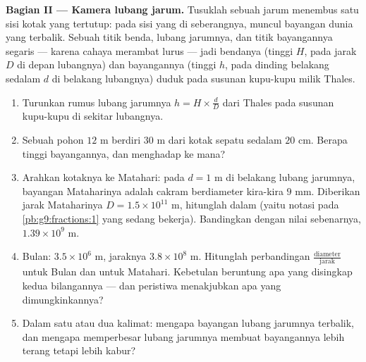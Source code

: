 \begin{problem}
\medskip
\noindent\textbf{Bagian II --- Kamera lubang jarum.}
Tusuklah sebuah jarum menembus satu sisi kotak yang tertutup: pada
sisi yang di seberangnya, muncul bayangan dunia yang terbalik. Sebuah
titik benda, lubang jarumnya, dan titik bayangannya segaris --- karena
cahaya merambat lurus --- jadi bendanya (tinggi $H$, pada jarak $D$
di depan lubangnya) dan bayangannya (tinggi $h$, pada dinding
belakang sedalam $d$ di belakang lubangnya) duduk pada susunan
kupu-kupu milik Thales.
\begin{enumerate}[resume]
  \item Turunkan rumus lubang jarumnya
        $h = H \times \frac dD$ dari Thales pada susunan kupu-kupu
        di sekitar lubangnya.
  \item Sebuah pohon $12$ m berdiri $30$ m dari kotak sepatu sedalam
        $20$ cm. Berapa tinggi bayangannya, dan menghadap ke mana?
  \item Arahkan kotaknya ke Matahari: pada $d = 1$ m di belakang
        lubang jarumnya, bayangan Mataharinya adalah cakram
        berdiameter kira-kira $9$ mm. Diberikan jarak Mataharinya
        $D = 1.5 \times 10^{11}$ m, hitunglah  dalam
         (yaitu notasi pada \cref{pb:g9:fractions:1}
        yang sedang bekerja). Bandingkan dengan nilai sebenarnya,
        $1.39 \times 10^9$ m.
  \item Bulan:  $3.5 \times 10^6$ m, jaraknya
        $3.8 \times 10^8$ m. Hitunglah perbandingan
        $\frac{\text{diameter}}{\text{jarak}}$ untuk Bulan
        dan untuk Matahari. Kebetulan beruntung apa yang disingkap
        kedua bilangannya --- dan peristiwa menakjubkan apa yang
        dimungkinkannya?
  \item Dalam satu atau dua kalimat: mengapa bayangan lubang
        jarumnya terbalik, dan mengapa memperbesar lubang jarumnya
        membuat bayangannya lebih terang tetapi lebih kabur?
\end{enumerate}


\end{problem}
